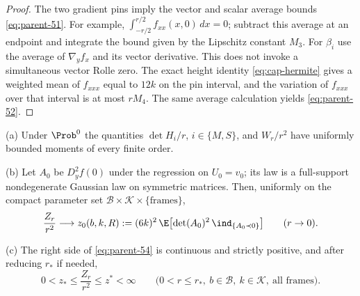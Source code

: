 \begin{proof}
The two gradient pins imply the vector and scalar average bounds \eqref{eq:parent-51}. For example, $\int_{-r/2}^{r/2}f_{xx}(x,0)\,dx=0$; subtract this average at an endpoint and integrate the bound given by the Lipschitz constant $M_3$. For $\beta_i$ use the average of $\nabla_yf_x$ and its vector derivative. This does not invoke a simultaneous vector Rolle zero. The exact height identity \eqref{eq:cap-hermite} gives a weighted mean of $f_{xxx}$ equal to $12k$ on the pin interval, and the variation of $f_{xxx}$ over that interval is at most $rM_4$. The same average calculation yields \eqref{eq:parent-52}.
\end{proof}

\begin{proposition}\label{prop:parent-normalizer}
\textup{(a)} Under $\Prob^0$ the quantities $\det H_i/r$, $i\in\{M,S\}$, and $W_r/r^2$ have uniformly bounded moments of every finite order.

\textup{(b)} Let $A_0$ be $D_y^2f(0)$ under the regression on $U_0=v_0$; its law is a full-support nondegenerate Gaussian law on symmetric matrices. Then, uniformly on the compact parameter set $\mathcal B\times\mathcal K\times\{\text{frames}\}$,
\begin{equation}\label{eq:parent-54}
\frac{Z_r}{r^2}\longrightarrow z_0(b,k,R):=(6k)^2\,\E\bigl[\det(A_0)^2\,\ind_{\{A_0\prec0\}}\bigr]\qquad(r\to0).
\end{equation}

\textup{(c)} The right side of \eqref{eq:parent-54} is continuous and strictly positive, and after reducing $r_*$ if needed,
\begin{equation}\label{eq:parent-55}
0<z_*\le\frac{Z_r}{r^2}\le z^*<\infty\qquad\bigl(0<r\le r_*,\ b\in\mathcal B,\ k\in\mathcal K,\ \text{all frames}\bigr).
\end{equation}
\end{proposition}

